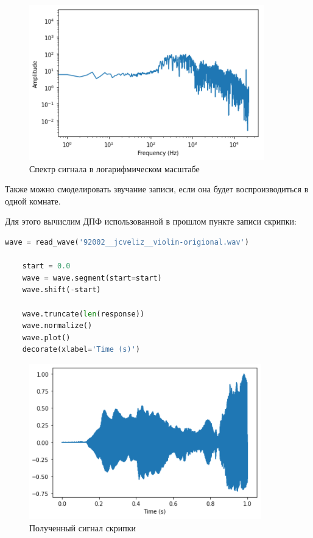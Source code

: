\documentclass[a4paper]{article}
\begin{document}
            \begin{figure}[H]
                \centering
                \includegraphics{ex_2_3.png}
                \caption{Спектр сигнала в логарифмическом масштабе}
                \label{fig:ex_2_3}
            \end{figure}
            
            Также можно смоделировать звучание записи, если она будет воспроизводиться в одной комнате.
            
            Для этого вычислим ДПФ использованной в прошлом пункте записи скрипки:
            
\begin{lstlisting}[language=Python, caption= Получение сигнала скрипки]
    wave = read_wave('92002__jcveliz__violin-origional.wav')
    
    start = 0.0
    wave = wave.segment(start=start)
    wave.shift(-start)
    
    wave.truncate(len(response))
    wave.normalize()
    wave.plot()
    decorate(xlabel='Time (s)')
\end{lstlisting}
            
            \begin{figure}[H]
                \centering
                \includegraphics{ex_2_4.png}
                \caption{Полученный сигнал скрипки}
                \label{fig:ex_2_4}
            \end{figure}
            
\end{document}

